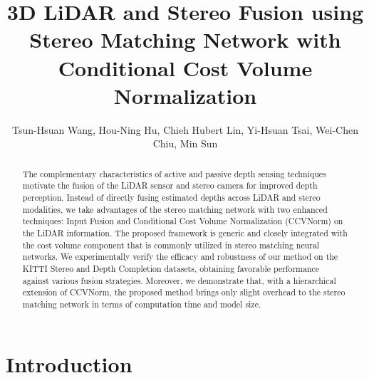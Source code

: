 \documentclass[letterpaper, 10 pt, conference]{ieeeconf}
\title{\LARGE \bf
3D LiDAR and Stereo Fusion using Stereo Matching Network with Conditional Cost Volume Normalization
}
\newcommand{\walon}[1]{{\color{red}{#1}}}
\newcommand{\walon}[1]{#1}
\newcommand{\modelNameIncat}{Input Fusion }
\newcommand{\modelNameCBNPunc}{CCVNorm}
\begin{document}
\author{Tsun-Hsuan Wang, Hou-Ning Hu, Chieh Hubert Lin, Yi-Hsuan Tsai, Wei-Chen Chiu, Min Sun}



\maketitle
\thispagestyle{empty}
\pagestyle{empty}


\begin{abstract}
The complementary characteristics of active and passive depth sensing techniques motivate the fusion of the LiDAR sensor and stereo camera for improved depth perception. Instead of directly fusing estimated depths across LiDAR and stereo modalities, we take advantages of the stereo matching network with two enhanced techniques: \modelNameIncat and Conditional Cost Volume Normalization (\modelNameCBNPunc) on the LiDAR information. The proposed framework is generic and closely integrated with the cost volume component that is commonly utilized in stereo matching neural networks. We experimentally verify the efficacy and robustness of our method on the KITTI Stereo and Depth Completion datasets, obtaining favorable performance against various fusion strategies. Moreover, we demonstrate that, with a hierarchical extension of \modelNameCBNPunc, the proposed method brings only slight overhead to the stereo matching network in terms of computation time and model size.



\end{abstract}


\section{Introduction}


\walon{
The accurate 3D perception has been desired since its vital role in numerous tasks of robotics and computer vision, such as autonomous driving, localization and mapping, path planning, and 3D reconstruction. Various techniques have been proposed to obtain depth estimation, ranging from active sensing sensors (e.g., RGB-D cameras and 3D LiDAR scanners) to passive sensing ones (e.g., stereo cameras). We observe that these sensors all have their own pros and cons, in which none of them perform well on all practical scenarios. For instance, RGB-D sensor is confined to its short-range depth acquisition and thereby 3D LiDAR is a common alternative in the challenging outdoor environment. However, 3D LiDARs are much more expensive and only provide sparse 3D depth estimates. In contrast, a stereo camera is able to obtain denser depth map based on stereo matching algorithms but is typically incapable of producing reliable matches in regions with repetitive patterns, homogeneous appearance, or large illumination change.} 
\end{document}
